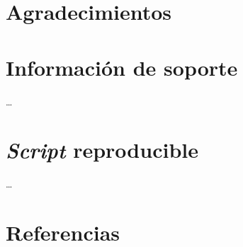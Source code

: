 \documentclass[11pt,]{article}
\begin{document}
\hypertarget{agradecimientos}{%
\section{Agradecimientos}\label{agradecimientos}}

\hypertarget{informaciuxf3n-de-soporte}{%
\section{Información de soporte}\label{informaciuxf3n-de-soporte}}

\ldots

\hypertarget{script-reproducible}{%
\section{\texorpdfstring{\emph{Script}
reproducible}{Script reproducible}}\label{script-reproducible}}

\ldots

\hypertarget{referencias}{%
\section{Referencias}\label{referencias}}




\newpage
\singlespacing 
\end{document}
